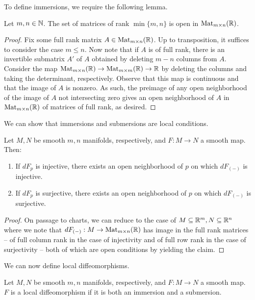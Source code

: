 To define immersions, we require the following lemma. 
\begin{lemma}\label{lem: subset of matrices of full rank is open}
    Let $m,n\in\mathbb{N}$. The set of matrices of rank $\min\{m,n\}$ is open in $\mathrm{Mat}_{m\times n}(\mathbb{R})$. 
\end{lemma}
\begin{proof}
    Fix some full rank matrix $A\in\mathrm{Mat}_{m\times n}(\mathbb{R})$. Up to transposition, it suffices to consider the case $m\leq n$. Now note that if $A$ is of full rank, there is an invertible submatrix $A'$ of $A$ obtained by deleting $m-n$ columns from $A$. Consider the map $\mathrm{Mat}_{m\times n}(\mathbb{R})\to\mathrm{Mat}_{m\times m}(\mathbb{R})\to\mathbb{R}$ by deleting the columns and taking the determinant, respectively. Observe that this map is continuous and that the image of $A$ is nonzero. As such, the preimage of any open neighborhood of the image of $A$ not intersecting zero gives an open neighborhood of $A$ in $\mathrm{Mat}_{m\times n}(\mathbb{R})$ of matrices of full rank, as desired. 
\end{proof}
We can show that immersions and submersions are local conditions. 
\begin{proposition}
    Let $M,N$ be smooth $m,n$ manifolds, respectively, and $F:M\to N$ a smooth map. Then:
    \begin{enumerate}[label=(\roman*)]
        \item If $dF_{p}$ is injective, there exists an open neighborhood of $p$ on which $dF_{(-)}$ is injective. 
        \item If $dF_{p}$ is surjective, there exists an open neighborhood of $p$ on which $dF_{(-)}$ is surjective.
    \end{enumerate}
\end{proposition}
\begin{proof}
    On passage to charts, we can reduce to the case of $M\subseteq\mathbb{R}^{m},N\subseteq\mathbb{R}^{n}$ where we note that $dF_{(-)}:M\to\mathrm{Mat}_{m\times n}(\mathbb{R})$ has image in the full rank matrices -- of full column rank in the case of injectivity and of full row rank in the case of surjectivity -- both of which are open conditions by  yielding the claim. 
\end{proof}
We can now define local diffeomorphisms. 
\begin{definition}\label{def: local diffeomorphism}
    Let $M,N$ be smooth $m,n$ manifolds, respectively, and $F:M\to N$ a smooth map. $F$ is a local diffeomorphism if it is both an immersion and a submersion. 
\end{definition}
